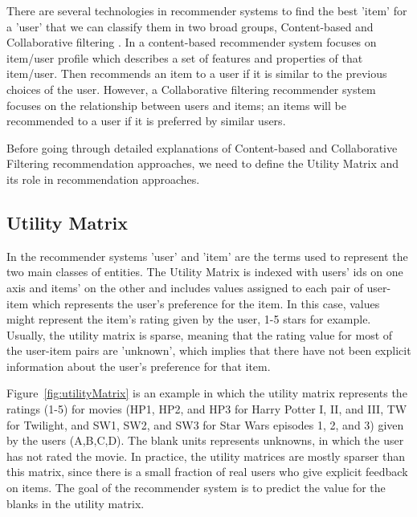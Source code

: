 There are several technologies in recommender systems to find the best 'item' for a 'user' that we can classify them in two broad groups, Content-based and Collaborative ﬁltering \cite{rajaraman2011mining}. In a content-based recommender system focuses on item/user profile which describes a set of features and properties of that item/user. Then recommends an item to a user if it is similar to the previous choices of the user. However, a Collaborative filtering recommender system focuses on the relationship between users and items; an items will be recommended to a user if it is preferred by similar users. 

Before going through detailed explanations of Content-based and Collaborative Filtering recommendation approaches, we need to define the Utility Matrix and its role in recommendation approaches. 
\subsection{Utility Matrix}
In the recommender systems 'user' and 'item' are the terms used to represent the two main classes of entities.  The Utility Matrix is indexed with users' ids on one axis and items' on the other and includes values assigned to each pair of user-item which represents the user's preference for the item. In this case, values might represent the item's rating given by the user, 1-5 stars for example. Usually, the utility matrix is sparse, meaning that the rating value for most of the user-item pairs are 'unknown', which implies that there have not been explicit information about the user's preference for that item. 

Figure~\ref{fig:utilityMatrix} is an example in which the utility matrix represents the ratings (1-5) for movies (HP1, HP2, and HP3 for Harry Potter I, II, and III, TW for Twilight, and SW1,
SW2, and SW3 for Star Wars episodes 1, 2, and 3) given by the users (A,B,C,D). The blank units represents unknowns, in which the user has not rated the movie. In practice, the utility matrices are mostly sparser than this matrix, since there is a small fraction of real users who give explicit feedback on items. The goal of the recommender system is to predict the value for the blanks in the utility matrix.



